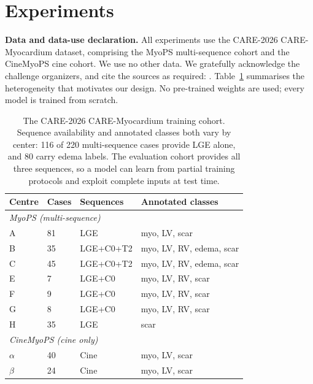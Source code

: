 \documentclass[runningheads]{llncs}
\begin{document}
\section{Experiments}
\label{sec:exp}

\noindent\textbf{Data and data-use declaration.} All experiments use the
CARE-2026 CARE-Myocardium dataset, comprising the MyoPS multi-sequence cohort
and the CineMyoPS cine cohort. We use no other data. We gratefully acknowledge
the challenge organizers, and cite the sources as required:
\cite{zhuang2019multivariate,qiu2023myopsnet,ding2023aligning,ding2025cinemyops}.
Table~\ref{tab:cohort} summarises the heterogeneity that motivates our design.
No pre-trained weights are used; every model is trained from scratch.

\begin{table}[t]
\centering
\caption{The CARE-2026 CARE-Myocardium training cohort. Sequence availability and
annotated classes both vary by center: 116 of 220 multi-sequence cases provide LGE
alone, and 80 carry edema labels. The evaluation cohort provides all three
sequences, so a model can learn from partial training protocols and exploit
complete inputs at test time.}
\label{tab:cohort}
\setlength{\tabcolsep}{5pt}
\begin{tabular}{llll}
\toprule
Centre & Cases & Sequences & Annotated classes \\
\midrule
\multicolumn{4}{l}{\textit{MyoPS (multi-sequence)}}\\
A & 81 & LGE & myo, LV, scar \\
B & 35 & LGE+C0+T2 & myo, LV, RV, edema, scar \\
C & 45 & LGE+C0+T2 & myo, LV, RV, edema, scar \\
E & 7 & LGE+C0 & myo, LV, RV, scar \\
F & 9 & LGE+C0 & myo, LV, RV, scar \\
G & 8 & LGE+C0 & myo, LV, RV, scar \\
H & 35 & LGE & scar \\
\midrule
\multicolumn{4}{l}{\textit{CineMyoPS (cine only)}}\\
$\alpha$ & 40 & Cine & myo, LV, scar \\
$\beta$ & 24 & Cine & myo, LV, scar \\
\bottomrule
\end{tabular}
\end{table}
\end{document}
